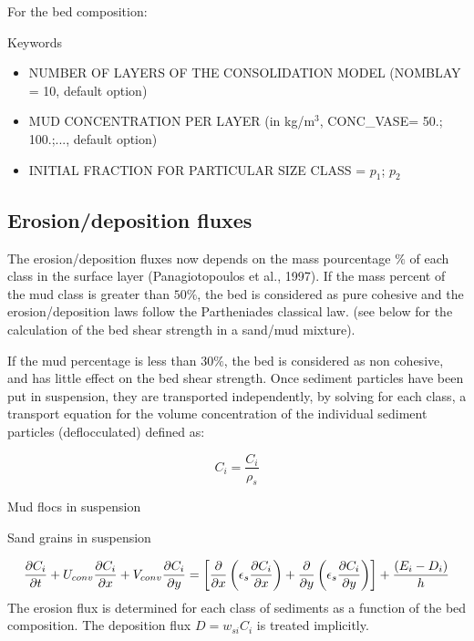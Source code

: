 For the bed composition:
\medskip
\begin{bclogo}[couleur=blue!10,arrondi=0.1, logo=\bcinfo]{Keywords}
\begin{itemize}
\item {\ttfamily NUMBER OF LAYERS OF THE CONSOLIDATION MODEL} ({\ttfamily NOMBLAY = 10}, default option)
\item {\ttfamily MUD CONCENTRATION PER LAYER} (in kg/m$^3$, {\ttfamily CONC\_VASE=
50.; 100.;...}, default option)
\item {\ttfamily INITIAL FRACTION FOR PARTICULAR SIZE CLASS = $p_1$; $p_2$} 
\end{itemize}
\end{bclogo}

\subsection{Erosion/deposition fluxes}
The erosion/deposition fluxes now depends on the mass pourcentage $\%$ of each class in
the surface layer (Panagiotopoulos et al., 1997). If the mass percent of the
mud class is greater than $50\%$, the bed is considered as pure cohesive and
the erosion/deposition laws follow the Partheniades classical law. (see
below for the calculation of the bed shear strength in a sand/mud mixture).

If the mud percentage is less than $30\%$, the bed is considered as non
cohesive, and has little effect on the bed shear strength. Once sediment particles have been put in suspension, they are transported independently, by solving for each class, a transport equation for the
volume concentration of the individual sediment particles (deflocculated)
defined as:

\begin{equation*}
C_i =\frac{C_i}{\rho_s} 
\end{equation*}

Mud flocs in suspension

Sand grains in suspension

\begin{equation*}
\frac{\partial C_i}{\partial t} + U_{conv}\frac{\partial C_i}{\partial
x} +V_{conv} \frac{\partial C_i}{\partial y} =\left[\frac{\partial }{%
\partial x} \left(\epsilon_s\frac{\partial C_i}{\partial x} \right) +%
\frac{\partial }{\partial y} \left( \epsilon_s\frac{\partial C_i}{%
\partial y} \right) \right] +\frac{(E_i - D_i)}{h} 
\end{equation*}%
The erosion flux is determined for each class of sediments as a function of
the bed composition. The deposition flux $D= w_{si} C_i$ is treated implicitly.

